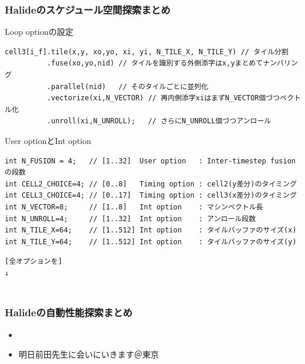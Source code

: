 \documentclass[dvipdfmx,cjk]{beamer}
\begin{document}
\begin{frame}[fragile]\frametitle{Halideのスケジュール空間探索まとめ}

Loop optionの設定

\begingroup \fontsize{8pt}{9pt}\selectfont
\begin{verbatim}
cell3[i_f].tile(x,y, xo,yo, xi, yi, N_TILE_X, N_TILE_Y) // タイル分割
          .fuse(xo,yo,nid) // タイルを識別する外側添字はx,yまとめてナンバリング
          .parallel(nid)   // そのタイルごとに並列化
          .vectorize(xi,N_VECTOR) // 再内側添字xiはまずN_VECTOR個づつベクトル化
          .unroll(xi,N_UNROLL);   // さらにN_UNROLL個づつアンロール
\end{verbatim}
\endgroup

User optionとInt option

\begingroup \fontsize{8pt}{9pt}\selectfont
\begin{verbatim}
int N_FUSION = 4;   // [1..32]  User option   : Inter-timestep fusionの段数
int CELL2_CHOICE=4; // [0..8]   Timing option : cell2(y差分)のタイミング
int CELL3_CHOICE=4; // [0..17]  Timing option : cell3(x差分)のタイミング
int N_VECTOR=8;     // [1..8]   Int option    : マシンベクトル長
int N_UNROLL=4;     // [1..32]  Int option    : アンロール段数
int N_TILE_X=64;    // [1..512] Int option    : タイルバッファのサイズ(x)
int N_TILE_Y=64;    // [1..512] Int option    : タイルバッファのサイズ(y)
\end{verbatim}
\endgroup

\begingroup \fontsize{8pt}{9pt}\selectfont
\begin{verbatim}
[全オプションを]
↓
\end{verbatim}
\endgroup
\end{frame}


\begin{frame}[fragile]\frametitle{}
\begingroup \fontsize{8pt}{9pt}\selectfont
\begin{verbatim}

\end{verbatim}
\endgroup
\end{frame}

\begin{frame}\frametitle{Halideの自動性能探索まとめ}
\begin{itemize}
\item 
\item 明日前田先生に会いにいきます＠東京
\end{itemize}

\end{frame}
\end{document}
